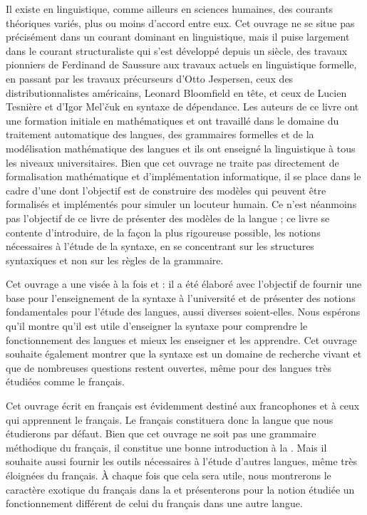 Il existe en linguistique, comme ailleurs en sciences humaines, des courants théoriques variés, plus ou moins d’accord entre eux. Cet ouvrage ne se situe pas précisément dans un courant dominant en linguistique, mais il puise largement dans le courant structuraliste qui s’est développé depuis un siècle, des travaux pionniers de Ferdinand de Saussure aux travaux actuels en linguistique formelle, en passant par les travaux précurseurs d’Otto Jespersen, ceux des distributionnalistes américains, Leonard Bloomfield en tête, et ceux de Lucien Tesnière et d’Igor Mel’čuk en syntaxe de dépendance. Les auteurs de ce livre ont une formation initiale en mathématiques et ont travaillé dans le domaine du traitement automatique des langues, des grammaires formelles et de la modélisation mathématique des langues et ils ont enseigné la linguistique à tous les niveaux universitaires. Bien que cet ouvrage ne traite pas directement de formalisation mathématique et d’implémentation informatique, il se place dans le cadre d’une  dont l’objectif est de construire des modèles qui peuvent être formalisés et implémentés pour simuler un locuteur humain. Ce n’est néanmoins pas l’objectif de ce livre de présenter des modèles de la langue ; ce livre se contente d’introduire, de la façon la plus rigoureuse possible, les notions nécessaires à l’étude de la syntaxe, en se concentrant sur les structures syntaxiques et non sur les règles de la grammaire.

Cet ouvrage a une visée à la fois  et : il a été élaboré avec l’objectif de fournir une base pour l’enseignement de la syntaxe à l’université et de présenter des notions fondamentales pour l’étude des langues, aussi diverses soient-elles. Nous espérons qu’il montre qu’il est utile d’enseigner la syntaxe pour comprendre le fonctionnement des langues et mieux les enseigner et les apprendre. Cet ouvrage souhaite également montrer que la syntaxe est un domaine de recherche vivant et que de nombreuses questions restent ouvertes, même pour des langues très étudiées comme le français.

Cet ouvrage écrit en français est évidemment destiné aux francophones et à ceux qui apprennent le français. Le français constituera donc la langue que nous étudierons par défaut. Bien que cet ouvrage ne soit pas une grammaire méthodique du français, il constitue une bonne introduction à la . Mais il souhaite aussi fournir les outils nécessaires à l’étude d’autres langues, même très éloignées du français. À chaque fois que cela sera utile, nous montrerons le caractère exotique du français dans la  et présenterons pour la notion étudiée un fonctionnement différent de celui du français dans une autre langue.



